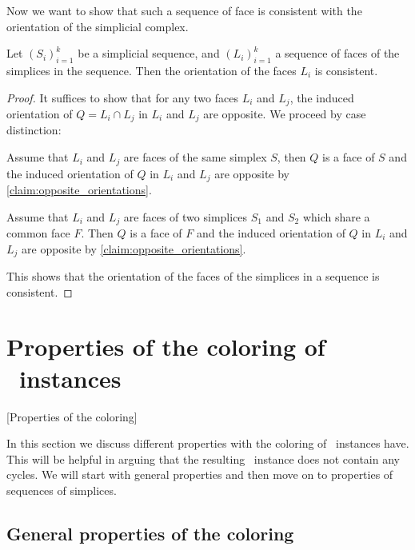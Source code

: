 Now we want to show that such a sequence of face is consistent with the orientation of the simplicial complex.
\begin{proposition}
    \label{prop:orientation_of_sequences_of_faces}
    Let $\left(S_i\right)_{i=1}^{k}$ be a simplicial sequence, and $\left(L_i\right)_{i=1}^{k}$ a sequence of faces of the simplices in the sequence. Then the orientation of the faces $L_i$ is consistent.
\end{proposition}
\begin{proof}
    It suffices to show that for any two faces $L_i$ and $L_j$, the induced orientation of $Q = L_i \cap L_j$ in $L_i$ and $L_j$ are opposite. We proceed by case distinction:
    \begin{case}{1}
        Assume that $L_i$ and $L_j$ are faces of the same simplex $S$, then $Q$ is a face of $S$ and the induced orientation of $Q$ in $L_i$ and $L_j$ are opposite by \cref{claim:opposite_orientations}.
    \end{case}
    \begin{case}{2}
        Assume that $L_i$ and $L_j$ are faces of two simplices $S_1$ and $S_2$ which share a common face $F$. Then $Q$ is a face of $F$ and the induced orientation of $Q$ in $L_i$ and $L_j$ are opposite by \cref{claim:opposite_orientations}.
    \end{case}
    This shows that the orientation of the faces of the simplices in a sequence is consistent.
\end{proof}

\section{Properties of the coloring of \Tarski\ instances}[Properties of the coloring]

In this section we discuss different properties with the coloring of \Tarski\ instances have. This will be helpful in arguing that the resulting \EndOfLine\ instance does not contain any cycles. We will start with general properties and then move on to properties of sequences of simplices.

\subsection{General properties of the coloring}

